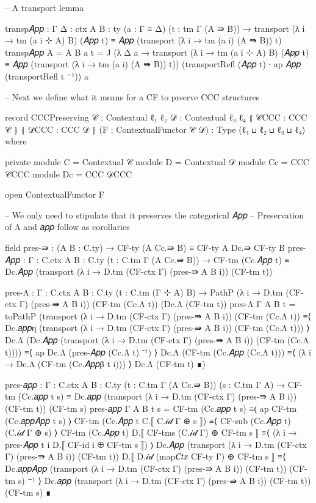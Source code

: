 \begin{code}[hide]
  -- A transport lemma

  transp𝐴𝑝𝑝 : {Γ Δ : ctx} {A B : ty} (a : Γ ≡ Δ) (t : tm Γ (A ⇛ B)) →
    transport (λ i → tm (a i ⊹ A) B) (𝐴𝑝𝑝 t) ≡ 𝐴𝑝𝑝 (transport (λ i → tm (a i) (A ⇛ B)) t)
  transp𝐴𝑝𝑝 {A = A} {B} a t =
    J (λ Δ a → transport (λ i → tm (a i ⊹ A) B) (𝐴𝑝𝑝 t)
      ≡ 𝐴𝑝𝑝 (transport (λ i → tm (a i) (A ⇛ B)) t))
      (transportRefl (𝐴𝑝𝑝 t) ∙ ap 𝐴𝑝𝑝 (transportRefl t ⁻¹)) a

-- Next we define what it means for a CF to prserve CCC structures

record CCCPreserving {𝒞 : Contextual ℓ₁ ℓ₂} {𝒟 : Contextual ℓ₃ ℓ₄}
       ⦃ 𝒞CCC : CCC 𝒞 ⦄ ⦃ 𝒟CCC : CCC 𝒟 ⦄ (F : ContextualFunctor 𝒞 𝒟)
       : Type (ℓ₁ ⊔ ℓ₂ ⊔ ℓ₃ ⊔ ℓ₄) where

  private
    module C = Contextual 𝒞
    module D = Contextual 𝒟
    module Cc = CCC 𝒞CCC
    module Dc = CCC 𝒟CCC

  open ContextualFunctor F

  -- We only need to stipulate that it preserves the categorical 𝐴𝑝𝑝
  -- Preservation of Λ and 𝑎𝑝𝑝 follow as corollaries

  field
    pres-⇛ : (A B : C.ty) → CF-ty (A Cc.⇛ B) ≡ CF-ty A Dc.⇛ CF-ty B
    pres-𝐴𝑝𝑝 : {Γ : C.ctx} {A B : C.ty} (t : C.tm Γ (A Cc.⇛ B)) →
      CF-tm (Cc.𝐴𝑝𝑝 t) ≡ Dc.𝐴𝑝𝑝 (transport (λ i → D.tm (CF-ctx Γ) (pres-⇛ A B i)) (CF-tm t))

  pres-Λ : {Γ : C.ctx} {A B : C.ty} (t : C.tm (Γ ⊹ A) B) →
    PathP (λ i → D.tm (CF-ctx Γ) (pres-⇛ A B i)) (CF-tm (Cc.Λ t)) (Dc.Λ (CF-tm t))
  pres-Λ {Γ} {A} {B} t =
    toPathP
      (transport (λ i → D.tm (CF-ctx Γ) (pres-⇛ A B i)) (CF-tm (Cc.Λ t))
        ≡⟨ Dc.𝑎𝑝𝑝η (transport (λ i → D.tm (CF-ctx Γ) (pres-⇛ A B i)) (CF-tm (Cc.Λ t))) ⟩
      Dc.Λ (Dc.𝐴𝑝𝑝 (transport (λ i → D.tm (CF-ctx Γ) (pres-⇛ A B i)) (CF-tm (Cc.Λ t))))
        ≡⟨ ap Dc.Λ (pres-𝐴𝑝𝑝 (Cc.Λ t) ⁻¹) ⟩
      Dc.Λ (CF-tm (Cc.𝐴𝑝𝑝 (Cc.Λ t)))
        ≡⟨ (λ i → Dc.Λ (CF-tm (Cc.𝐴𝑝𝑝β t i))) ⟩
      Dc.Λ (CF-tm t)
        ∎)

  pres-𝑎𝑝𝑝 : {Γ : C.ctx} {A B : C.ty} (t : C.tm Γ (A Cc.⇛ B)) (s : C.tm Γ A) →
    CF-tm (Cc.𝑎𝑝𝑝 t s) ≡
    Dc.𝑎𝑝𝑝 (transport (λ i → D.tm (CF-ctx Γ) (pres-⇛ A B i)) (CF-tm t)) (CF-tm s)
  pres-𝑎𝑝𝑝 {Γ} {A} {B} t s =
    CF-tm (Cc.𝑎𝑝𝑝 t s)
      ≡⟨ ap CF-tm (Cc.𝑎𝑝𝑝𝐴𝑝𝑝 t s) ⟩
    CF-tm (Cc.𝐴𝑝𝑝 t C.⟦ C.𝒾𝒹 Γ ⊕ s ⟧)
      ≡⟨ CF-sub (Cc.𝐴𝑝𝑝 t) (C.𝒾𝒹 Γ ⊕ s) ⟩
    CF-tm (Cc.𝐴𝑝𝑝 t) D.⟦ CF-tms (C.𝒾𝒹 Γ) ⊕ CF-tm s ⟧
      ≡⟨ (λ i → pres-𝐴𝑝𝑝 t i D.⟦ CF-id i ⊕  CF-tm s ⟧) ⟩
    Dc.𝐴𝑝𝑝 (transport (λ i → D.tm (CF-ctx Γ) (pres-⇛ A B i)) (CF-tm t))
      D.⟦ D.𝒾𝒹 (map𝐶𝑡𝑥 CF-ty Γ) ⊕ CF-tm s ⟧
      ≡⟨ Dc.𝑎𝑝𝑝𝐴𝑝𝑝 (transport (λ i → D.tm (CF-ctx Γ) (pres-⇛ A B i)) (CF-tm t)) (CF-tm s) ⁻¹ ⟩
    Dc.𝑎𝑝𝑝 (transport (λ i → D.tm (CF-ctx Γ) (pres-⇛ A B i)) (CF-tm t)) (CF-tm s)
      ∎


\end{code}
